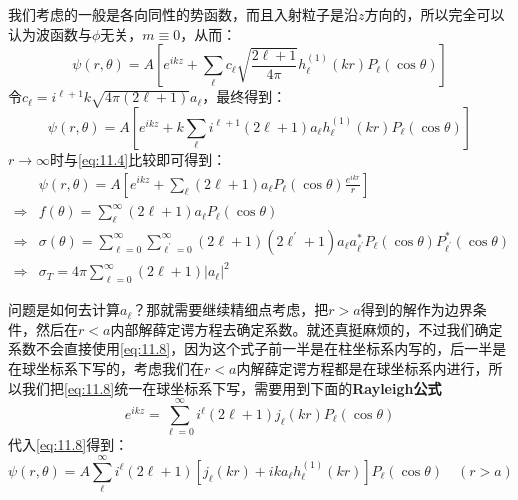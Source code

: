\documentclass[a4paper,zihao=-4,linespread=1]{ctexrep}
\begin{document}
	我们考虑的一般是各向同性的势函数，而且入射粒子是沿$z$方向的，所以完全可以认为波函数与$\phi$无关，$m\equiv 0$，从而：
	\[\psi(r,\theta)=A\left[e^{ikz}+\sum_{\ell}c_{\ell}\sqrt{\frac{2\ell+1}{4\pi}}h^{(1)}_\ell(kr)P_\ell(\cos\theta)\right]\]
	令$c_\ell=i^{\ell+1}k\sqrt{4\pi(2\ell+1)}a_\ell$，最终得到：
	\begin{equation}
		\label{eq:11.8}
		\psi(r,\theta)=A\left[e^{ikz}+k\sum_{\ell}i^{\ell+1}(2\ell+1)a_\ell h^{(1)}_\ell(kr)P_\ell(\cos\theta)\right]
	\end{equation}
	$r\to\infty$时与\ref{eq:11.4}比较即可得到：
	\begin{equation}
		\label{eq:11.9}
		\begin{aligned}
		&\psi(r,\theta)=A\left[e^{ikz}+\sum_{\ell}(2\ell+1)a_\ell P_\ell(\cos\theta)\frac{e^{ikr}}{r}\right]\\
		\Rightarrow&f(\theta)=\sum_\ell^\infty (2\ell+1)a_\ell P_\ell(\cos\theta)\\
		\Rightarrow&\sigma(\theta)=\sum_{\ell=0}^\infty\sum_{\ell^\prime=0}^\infty(2\ell+1)(2\ell^\prime+1)a_\ell a_{\ell^\prime}^* P_\ell(\cos\theta) P_{\ell^\prime}^*(\cos\theta)\\
		\Rightarrow&\sigma_T=4\pi\sum_{\ell=0}^\infty(2\ell+1)|a_\ell|^2
		\end{aligned}
	\end{equation}
	
	问题是如何去计算$a_\ell$？那就需要继续精细点考虑，把$r>a$得到的解作为边界条件，然后在$r<a$内部解薛定谔方程去确定系数。就还真挺麻烦的，不过我们确定系数不会直接使用\ref{eq:11.8}，因为这个式子前一半是在柱坐标系内写的，后一半是在球坐标系下写的，考虑我们在$r<a$内解薛定谔方程都是在球坐标系内进行，所以我们把\ref{eq:11.8}统一在球坐标系下写，需要用到下面的\textbf{Rayleigh公式}
	\begin{equation}
		e^{ikz}=\sum_{\ell=0}^\infty i^\ell(2\ell+1)j_\ell(kr)P_\ell(\cos\theta)
	\end{equation}
	代入\ref{eq:11.8}得到：
	\begin{equation}
		\label{eq:11.11}
		\boxed{
		\psi(r,\theta)=A\sum_\ell^\infty i^\ell(2\ell+1)\left[j_\ell(kr)+ika_\ell h^{(1)}_\ell(kr)\right]P_\ell(\cos\theta)\quad(r>a)
	}
	\end{equation}
	
\end{document}
